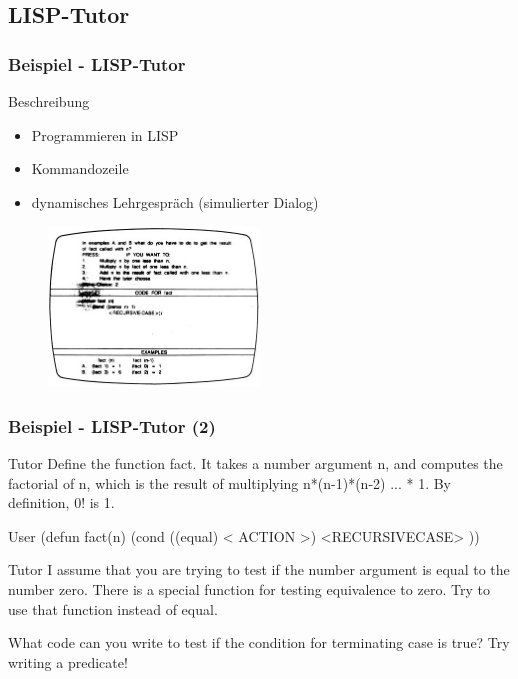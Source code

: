 \documentclass{beamer}
\begin{document}
\subsection{LISP-Tutor}
\begin{frame}
  \frametitle{Beispiel - LISP-Tutor}
  \begin{block}{Beschreibung}
    \begin{itemize}
      \item Programmieren in LISP
      \item Kommandozeile
      \item dynamisches Lehrgespräch (simulierter Dialog)
    \end{itemize}
  \end{block}

  \begin{figure}
    \centering
    \includegraphics[width=0.5\textwidth]{../bilder/greaterp2.jpg}
  \end{figure}
\end{frame}

\begin{frame}
  \frametitle{Beispiel - LISP-Tutor (2)}
  \begin{alertblock}{Tutor}
    Define the function fact. It takes a number argument n, and computes the
    factorial of n, which is the result of multiplying n*(n-1)*(n-2) ... * 1.
    By definition, 0! is 1.
  \end{alertblock}

  \begin{block}{User}
    (defun fact(n)
      (cond ((equal) < ACTION >)
      <RECURSIVECASE>
    ))
  \end{block}

  \begin{alertblock}{Tutor}
    I assume that you are trying to test if the number argument is equal to
    the number zero. There is a special function for testing equivalence to zero.
    Try to use that function instead of equal.

    What code can you write to test if the condition for terminating case is true?
    Try writing a predicate!
  \end{alertblock}

\end{frame}
\end{document}
